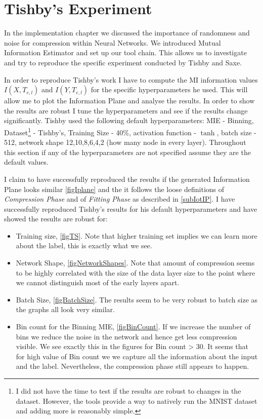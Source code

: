 \documentclass[dissertation.tex]{subfiles}
\begin{document}
\section{Tishby's Experiment}

In the implementation chapter we discussed the importance of randomness and
noise for compression within Neural Networks. We introduced Mutual Information
Estimator and set up our tool chain. This allows us to investigate and try to
reproduce the specific experiment conducted by Tishby and Saxe.

In order to reproduce Tishby's work I have to compute the MI information values
$I(X, T_{e,l})$ and $I(Y, T_{e,l})$ for the specific hyperparameters he used.
This will allow me to plot the Information Plane and analyse the results.  In
order to show the results are robust I tune the hyperparameters and see if the
results change significantly. Tishby used the following default hyperparameters:
MIE - Binning, Dataset\footnote{I did not have the time to test if the results
are robust to changes in the dataset.  However, the tools provide a way to
natively run the MNIST dataset and adding more is reasonably simple.} -
Tishby's, Training Size - 40\%, activation function - $\tanh$, batch size - 512,
network shape 12,10,8,6,4,2 (how many node in every layer). Throughout this
section if any of the hyperparameters are not specified assume they are the
default values. 

I claim to have successfully reproduced the results if the generated Information
Plane looks similar \autoref{figIplane} and the it follows the loose definitions
of \emph{Compression Phase} and of \emph{Fitting Phase} as described in
\autoref{subIotIP}. I have successfully reproduced Tishby's results for his
default hyperparameters and have showed the results are robust for:
\begin{itemize}
  \item{
      Training size, \autoref{figTS}. Note that higher training set implies we
      can learn more about the label, this is exactly what we see.
    }
  \item{
      Network Shape, \autoref{figNetworkShapes}. Note that amount of compression
      seems to be highly correlated with the size of the data layer size to the
      point where we cannot distinguish most of the early layers apart.
    }
  \item{
      Batch Size, \autoref{figBatchSize}. The results seem to be very robust to
      batch size as the graphs all look very similar. 
    }
  \item{
      Bin count for the Binning MIE, \autoref{figBinCount}. If we increase the
      number of bins we reduce the noise in the network and hence get less
      compression visible. We see exactly this in the figures for Bin count >
      30. It seems that for high value of Bin count we we capture all the
      information about the input and the label. Nevertheless, the compression
      phase still appears to happen.
    }
\end{itemize}
\end{document}
